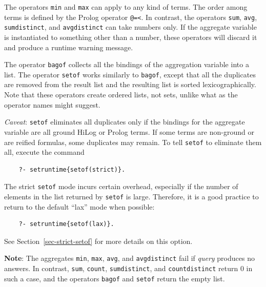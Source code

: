 \documentclass[11pt]{article}
\begin{document}
The operators {\tt min} and {\tt max} can apply to any kind of
terms. The order among terms is defined by the Prolog operator {\tt @=<}.  In
contrast, the operators {\tt sum}, {\tt avg}, \texttt{sumdistinct}, and
\texttt{avgdistinct} 
can take numbers only. If
the aggregate variable is instantiated to something other than a
number, these operators will discard it and produce a runtime
warning message.

The operator {\tt bagof} collects all the bindings of
the aggregation variable into a list. The operator {\tt setof} works
similarly to {\tt bagof}, except that all the duplicates are removed
from the result list and the resulting list is sorted lexicographically.
Note that these operators create ordered lists, not sets, unlike what
as the operator names might suggest.

\noindent
\emph{Caveat}: \texttt{setof} eliminates all duplicates only if the bindings for
the aggregate variable are all ground HiLog or Prolog terms. 
If some terms are non-ground or are reified formulas, some duplicates may remain.
To tell \texttt{setof} to eliminate them all, execute the command
\begin{verbatim}
    ?- setruntime{setof(strict)}.
\end{verbatim}
The strict \texttt{setof} mode incurs certain overhead, especially if the
number of elements in the list returned by \texttt{setof} is large.
Therefore, it is a good practice to return to the default ``lax'' mode when
possible:
\begin{verbatim}
    ?- setruntime{setof(lax)}.
\end{verbatim}
See Section~\ref{sec-strict-setof} for more details on this option.


\textbf{Note}: 
The aggregates {\tt min}, {\tt max}, {\tt avg}, and \texttt{avgdistinct}  
fail if \emph{query}  produces no answers.
In contrast, \texttt{sum}, \texttt{count}, \texttt{sumdistinct}, and
\texttt{countdistinct} return 0 in such a case, and the operators
{\tt bagof} and {\tt setof}
return the empty list.
\end{document}
